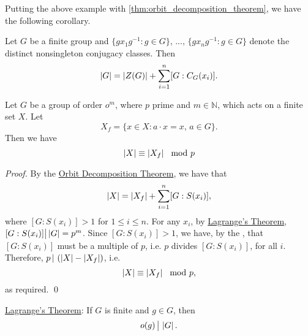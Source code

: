 Putting the above example with \cref{thm:orbit_decomposition_theorem}, we have the following corollary.

\begin{crly}
\label{crly:class_equation}
  Let $G$ be a finite group and $\{gx_1 g^{-1} : g \in G \}, \, ..., \, \{g x_n g^{-1} : g \in G \}$ denote the distinct nonsingleton conjugacy classes. Then
  \begin{equation*}
    \left|G\right| = \left|Z(G)\right| + \sum_{i=1}^{n} [ G : C_G(x_i) ].
  \end{equation*}
\end{crly}

\begin{lemma}
\label{lemma:abs_x_equiv_abs_x_f}
  Let $G$ be a group of order $o^m$, where $p$ prime and $m \in \mathbb{N}$, which acts on a finite set $X$. Let
  \begin{equation*}
    X_f = \{ x \in X : a \cdot x = x, \, a \in G \}.
  \end{equation*}
  Then we have
  \begin{equation*}
    \left|X\right| \equiv \left|X_f\right| \mod p
  \end{equation*}
\end{lemma}

\begin{proof}
  By the \hyperref[thm:orbit_decomposition_theorem]{Orbit Decomposition Theorem}, we have that
  \begin{equation*}
    \left|X\right| = \left|X_f\right| + \sum_{i=1}^{n} [ G : S(x_i) ],
  \end{equation*}
  where $[ G : S(x_i) ] > 1$ for $1 \leq i \leq n$. For any $x_i$, by \hyperref[thm:lagrange_s_theorem]{Lagrange's Theorem}, $[ G : S(x_i) ] \big| \left|G\right| = p^m$. Since $[ G : S(x_i) ] > 1$, we have, by the , that $[ G : S(x_i) ]$ must be a multiple of $p$, i.e. $p$ divides $[ G : S(x_i) ]$, for all $i$. Therefore, $p \, | \, \left( \left|X\right| - \left|X_f\right| \right)$, i.e.
  \begin{equation*}
    \left|X\right| \equiv \left|X_f\right| \mod p,
  \end{equation*}
  as required. \qed
\end{proof}

 \hyperref[thm:lagrange_s_theorem]{Lagrange's Theorem}: If $G$ is finite and $g \in G$, then
\begin{equation*}
  o(g) \, \big| \, \left|G\right|.
\end{equation*}

